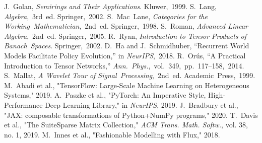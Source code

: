 \documentclass[11pt]{article}
\begin{document}
\begin{thebibliography}{9}
\footnotesize
{} J.~Golan, \emph{Semirings and Their Applications}. Kluwer, 1999.
 S.~Lang, \emph{Algebra}, 3rd ed. Springer, 2002.
 S.~Mac~Lane, \emph{Categories for the Working Mathematician}, 2nd ed. Springer, 1998.
 S.~Roman, \emph{Advanced Linear Algebra}, 2nd ed. Springer, 2005.
 R.~Ryan, \emph{Introduction to Tensor Products of Banach Spaces}. Springer, 2002.
 D.~Ha and J.~Schmidhuber, “Recurrent World Models Facilitate Policy Evolution,” in \emph{NeurIPS}, 2018.
 R.~Orús, “A Practical Introduction to Tensor Networks,” \emph{Ann. Phys.}, vol. 349, pp. 117–158, 2014.
 S.~Mallat, \emph{A Wavelet Tour of Signal Processing}, 2nd ed. Academic Press, 1999.
 M.~Abadi et al., "TensorFlow: Large-Scale Machine Learning on Heterogeneous Systems," 2019.
 A.~Paszke et al., "PyTorch: An Imperative Style, High-Performance Deep Learning Library," in \emph{NeurIPS}, 2019.
 J.~Bradbury et al., "JAX: composable transformations of Python+NumPy programs," 2020.
 T.~Davis et al., "The SuiteSparse Matrix Collection," \emph{ACM Trans. Math. Softw.}, vol. 38, no. 1, 2019.
 M.~Innes et al., "Fashionable Modelling with Flux," 2018.
\end{thebibliography}
\end{document}
